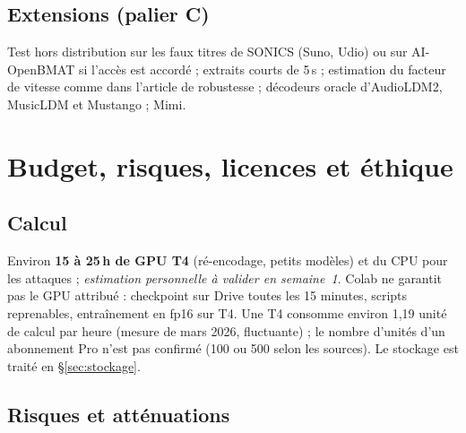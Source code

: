 \documentclass[11pt,a4paper]{article}
\begin{document}
\subsection{Extensions (palier C)}

Test hors distribution sur les faux titres de SONICS (Suno, Udio) ou sur AI-OpenBMAT si l'accès est accordé ; extraits courts de 5\,s ; estimation du facteur de vitesse comme dans l'article de robustesse ; décodeurs oracle d'AudioLDM2, MusicLDM et Mustango ; Mimi.

\section{Budget, risques, licences et éthique}
\label{sec:budget}

\subsection{Calcul}

Environ \textbf{15 à 25\,h de GPU T4} (ré-encodage, petits modèles) et du CPU pour les attaques ; \emph{estimation personnelle à valider en semaine~1}. Colab ne garantit pas le GPU attribué : checkpoint sur Drive toutes les 15 minutes, scripts reprenables, entraînement en fp16 sur T4. Une T4 consomme environ 1,19 unité de calcul par heure (mesure de mars 2026, fluctuante) ; le nombre d'unités d'un abonnement Pro n'est pas confirmé (100 ou 500 selon les sources). Le stockage est traité en \S\ref{sec:stockage}.

\subsection{Risques et atténuations}
\end{document}
